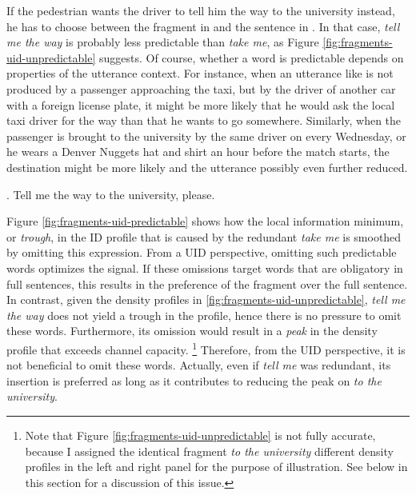 If the pedestrian wants the driver to tell him the way to the university instead, he has to choose between the fragment in \Last[b] and the sentence in \Next. In that case, \textit{tell me the way} is probably less predictable than \textit{take me}, as Figure \ref{fig:fragments-uid-unpredictable} suggests. Of course, whether a word is predictable depends on properties of the utterance context. For instance, when an utterance like \Next is not produced by a passenger approaching the taxi, but by the driver of another car with a foreign license plate, it might be more likely that he would ask the local taxi driver for the way than that he wants to go somewhere. Similarly, when the passenger is brought to the university by the same driver on every Wednesday, or he wears a Denver Nuggets hat and shirt an hour before the match starts, the destination might be more likely and the utterance possibly even further reduced. %

\ex. Tell me the way to the university, please.

Figure \ref{fig:fragments-uid-predictable} shows how the local information minimum, or \textit{trough}, in the ID profile that is caused by the redundant \textit{take me} is smoothed by omitting this expression. From a UID perspective, omitting such predictable words optimizes the signal. If these omissions target words that are obligatory in full sentences, this results in the preference of the fragment over the full sentence. In contrast, given the density profiles in \ref{fig:fragments-uid-unpredictable}, \textit{tell me the way} does not yield a trough in the profile, hence there is no pressure to omit these words. Furthermore, its omission would result in a \textit{peak} in the density profile that exceeds channel capacity.%
%
\footnote{Note that Figure \ref{fig:fragments-uid-unpredictable} is not fully accurate, because I assigned the identical fragment \textit{to the university} different density profiles in the left and right panel for the purpose of illustration. See below in this section for a discussion of this issue.}\afterfn%
%
Therefore, from the UID perspective, it is not beneficial to omit these words. Actually, even if \textit{tell me} was redundant, its insertion is preferred as long as it contributes to reducing the peak on \textit{to the university}. 

